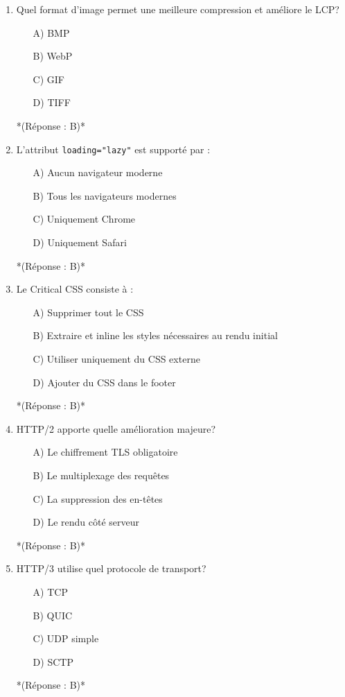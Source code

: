 \documentclass[12pt,a4paper,twoside]{report}
\begin{document}
\begin{enumerate}
\item Quel format d'image permet une meilleure compression et améliore le LCP?
\begin{itemize}
\item[A)] BMP
\item[B)] WebP
\item[C)] GIF
\item[D)] TIFF
\end{itemize}
*(Réponse : B)*

\item L'attribut \texttt{loading="lazy"} est supporté par :
\begin{itemize}
\item[A)] Aucun navigateur moderne
\item[B)] Tous les navigateurs modernes
\item[C)] Uniquement Chrome
\item[D)] Uniquement Safari
\end{itemize}
*(Réponse : B)*

\item Le Critical CSS consiste à :
\begin{itemize}
\item[A)] Supprimer tout le CSS
\item[B)] Extraire et inline les styles nécessaires au rendu initial
\item[C)] Utiliser uniquement du CSS externe
\item[D)] Ajouter du CSS dans le footer
\end{itemize}
*(Réponse : B)*

\item HTTP/2 apporte quelle amélioration majeure?
\begin{itemize}
\item[A)] Le chiffrement TLS obligatoire
\item[B)] Le multiplexage des requêtes
\item[C)] La suppression des en-têtes
\item[D)] Le rendu côté serveur
\end{itemize}
*(Réponse : B)*

\item HTTP/3 utilise quel protocole de transport?
\begin{itemize}
\item[A)] TCP
\item[B)] QUIC
\item[C)] UDP simple
\item[D)] SCTP
\end{itemize}
*(Réponse : B)*


\end{enumerate}
\end{document}
